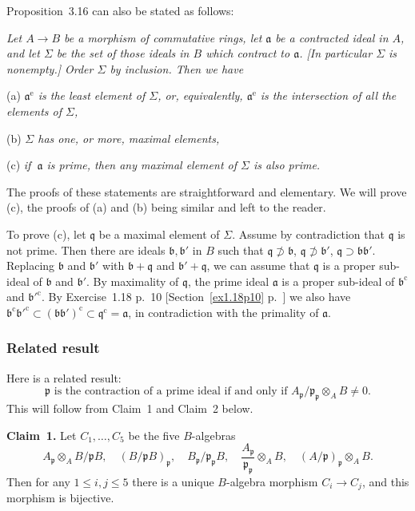 \documentclass[12pt,letterpaper]{article}%
\newcommand{\oo}{\operatorname}\newcommand{\ooo}{\operatorname*}
\newcommand{\mf}{\mathfrak}
\newcommand{\aaa}{\mf a}
\newcommand{\bbb}{\mf b}
\newcommand{\ppp}{\mf p}
\newcommand{\qqq}{\mf q}
\newcommand{\nn}{\noindent}
\begin{document}
Proposition~3.16 can also be stated as follows:

\nn\emph{Let $A\to B$ be a morphism of commutative rings, let $\aaa$ be a contracted ideal in $A$, and let $\Sigma$ be the set of those ideals in $B$ which contract to $\aaa$. [In particular $\Sigma$ is nonempty.] Order $\Sigma$ by inclusion. Then we have}

\nn(a) \emph{$\aaa^{\oo e}$ is the least element of $\Sigma$, or, equivalently, $\aaa^{\oo e}$ is the intersection of all the elements of $\Sigma$,}

\nn(b) \emph{$\Sigma$ has one, or more, maximal elements,}

\nn(c) \emph{if $\ \aaa$ is prime, then any maximal element of $\Sigma$ is also prime.}

The proofs of these statements are straightforward and elementary. We will prove (c), the proofs of (a) and (b) being similar and left to the reader.

To prove (c), let $\qqq$ be a maximal element of $\Sigma$. Assume by contradiction that $\qqq$ is not prime. Then there are ideals $\mf{b,b}'$ in $B$ such that $\qqq\not\supset\bbb$, $\qqq\not\supset\bbb'$, $\qqq\supset\mf{bb}'$. Replacing $\bbb$ and $\bbb'$ with $\bbb+\qqq$ and $\bbb'+\qqq$, we can assume that $\qqq$ is a proper sub-ideal of $\bbb$ and $\bbb'$. By maximality of $\qqq$, the prime ideal $\aaa$ is a proper sub-ideal of $\bbb^{\oo c}$ and $\bbb'^{\oo c}$. By Exercise~1.18 p.~10 [Section~\ref{ex1.18p10} p.~\pageref{ex1.18p10}] we also have $\bbb^{\oo c}\bbb'^{\oo c}\subset(\mf{bb}')^{\oo c}\subset\qqq^{\oo c}=\aaa$, in contradiction with the primality of $\aaa$.

\subsubsection{Related result}\label{res}%

Here is a related result:
\begin{equation}\label{fiber1}
\ppp\text{ is the contraction of a prime ideal if and only if }A_\ppp/\ppp_\ppp\otimes_AB\ne0.
\end{equation}
This will follow from Claim~1 and Claim~2 below.

\nn\textbf{Claim~1.} Let $C_1,\ldots,C_5$ be the five $B$-algebras 
$$
A_\ppp\otimes_AB/\ppp B,\quad (B/\ppp B)_\ppp,\quad B_\ppp/\ppp_\ppp B,\quad%
\frac{A_\ppp}{\ppp_\ppp}\otimes_AB,\quad (A/\ppp)_\ppp\otimes_AB.
$$ 
Then for any $1\le i,j\le5$ there is a unique $B$-algebra morphism $C_i\to C_j$, and this morphism is bijective.
\end{document}
